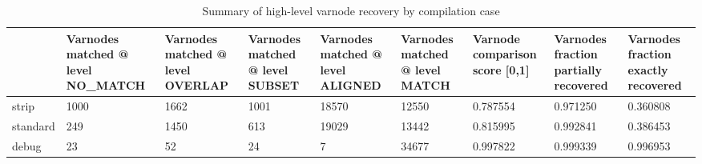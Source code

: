 \begin{table}[t]
\centering
\caption{Summary of high-level varnode recovery by compilation case}
\label{table:opts-varnodes-summary-decomposed}
\begin{tabular}{lp{2.2cm}p{2.2cm}p{2.2cm}p{2.2cm}p{2.2cm}p{2.2cm}p{2.2cm}p{2.2cm}}
\toprule
{} &  Varnodes matched @ level NO\_MATCH &  Varnodes matched @ level OVERLAP &  Varnodes matched @ level SUBSET &  Varnodes matched @ level ALIGNED &  Varnodes matched @ level MATCH &  Varnode comparison score [0,1] &  Varnodes fraction partially recovered &  Varnodes fraction exactly recovered \\
\midrule
strip    &                               1000 &                              1662 &                             1001 &                             18570 &                           12550 &                        0.787554 &                               0.971250 &                             0.360808 \\
standard &                                249 &                              1450 &                              613 &                             19029 &                           13442 &                        0.815995 &                               0.992841 &                             0.386453 \\
debug    &                                 23 &                                52 &                               24 &                                 7 &                           34677 &                        0.997822 &                               0.999339 &                             0.996953 \\
\bottomrule
\end{tabular}
\end{table}
